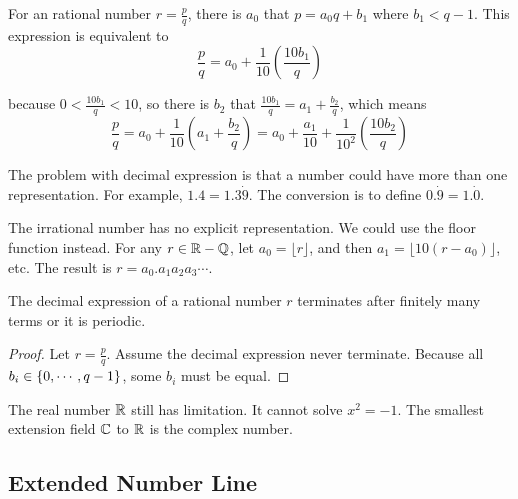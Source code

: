 \begin{example}
    For an rational number $r = \frac{p}{q}$, there is $a_0$ that $p = a_0 q + b_1$ where $b_1 < q-1$. This expression is equivalent to 
    \begin{equation}
        \frac{p}{q} = a_0 + \frac{1}{10} \left(\frac{10 b_1}{q} \right)
    \end{equation}
    
    because $0 < \frac{10 b_1}{q} < 10$, so there is $b_2$ that $\frac{10 b_1}{q} = a_1 + \frac{b_2}{q}$, which means
    \begin{equation}
        \frac{p}{q} = a_0 + \frac{1}{10} \left( a_1 + \frac{b_2}{q} \right) = a_0 + \frac{a_1}{10} + \frac{1}{10^2} \left(\frac{10 b_2}{q} \right)
    \end{equation}
    
    The problem with decimal expression is that a number could have more than one representation. For example, $1.4 = 1.3 \dot 9$. The conversion is to define $0.\dot 9 = 1.\dot 0$.
    
    The irrational number has no explicit representation. We could use the floor function instead. For any $r \in \mathbb{R} - \mathbb{Q}$, let $a_0 = \lfloor r \rfloor$, and then $a_1 = \lfloor 10(r-a_0) \rfloor$, etc. The result is $r = a_0 . a_1 a_2 a_3 \cdots$.
\end{example}

\begin{theorem}
    The decimal expression of a rational number $r$ terminates after finitely many terms or it is periodic.    
\end{theorem}
\begin{proof}
    Let $r = \frac{p}{q}$. Assume the decimal expression never terminate. Because all $b_i \in \set{0, \cdots, q -1}$, some $b_i$ must be equal.
\end{proof}





The real number $\mathbb{R}$ still has limitation. It cannot solve $x^2 = -1$. The smallest extension field $\mathbb{C}$ to $\mathbb{R}$ is the complex number.



\subsection{Extended Number Line}

